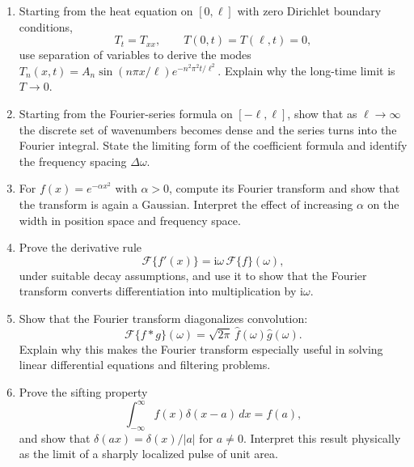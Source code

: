 \begin{enumerate}
    \item\label{ex:fourier-heat} Starting from the heat equation on $[0,\ell]$ with zero Dirichlet boundary conditions,
    \begin{equation*}
        T_t=T_{xx},\qquad T(0,t)=T(\ell,t)=0,
    \end{equation*}
    use separation of variables to derive the modes $T_n(x,t)=A_n\sin(n\pi x/\ell)e^{-n^2\pi^2 t/\ell^2}$. Explain why the long-time limit is $T\to0$.

    \item\label{ex:fourier-transform-limit} Starting from the Fourier-series formula on $[-\ell,\ell]$, show that as $\ell\to\infty$ the discrete set of wavenumbers becomes dense and the series turns into the Fourier integral. State the limiting form of the coefficient formula and identify the frequency spacing $\Delta\omega$.

    \item\label{ex:fourier-gaussian} For $f(x)=e^{-\alpha x^2}$ with $\alpha>0$, compute its Fourier transform and show that the transform is again a Gaussian. Interpret the effect of increasing $\alpha$ on the width in position space and frequency space.

    \item\label{ex:fourier-derivative} Prove the derivative rule
    \begin{equation*}
        \mathcal{F}\{f'(x)\}=\mathrm{i}\omega\,\mathcal{F}\{f\}(\omega),
    \end{equation*}
    under suitable decay assumptions, and use it to show that the Fourier transform converts differentiation into multiplication by $\mathrm{i}\omega$.

    \item\label{ex:fourier-convolution} Show that the Fourier transform diagonalizes convolution:
    \begin{equation*}
        \mathcal{F}\{f*g\}(\omega)=\sqrt{2\pi}\,\hat f(\omega)\hat g(\omega).
    \end{equation*}
    Explain why this makes the Fourier transform especially useful in solving linear differential equations and filtering problems.

    \item\label{ex:delta-sifting} Prove the sifting property
    \begin{equation*}
        \int_{-\infty}^{\infty}f(x)\delta(x-a)\,dx=f(a),
    \end{equation*}
    and show that $\delta(ax)=\delta(x)/|a|$ for $a\neq0$. Interpret this result physically as the limit of a sharply localized pulse of unit area.


\end{enumerate}
